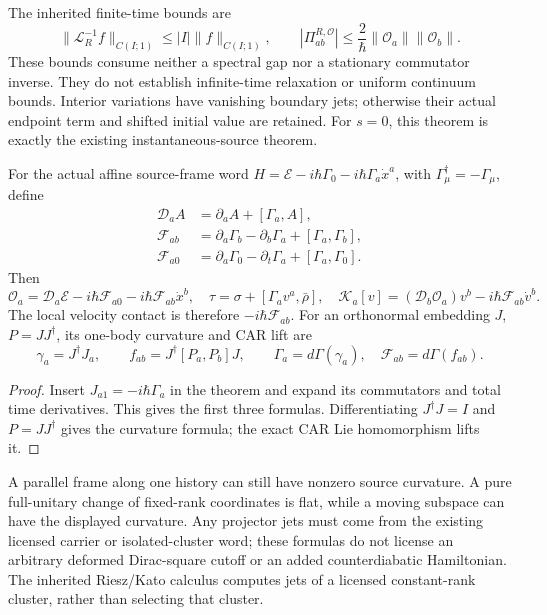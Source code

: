 \documentclass[12pt,a4paper]{article}
\begin{document}
The inherited finite-time bounds are
\[
 \|\mathscr L_R^{-1}f\|_{C(I;1)}\le |I|\|f\|_{C(I;1)},\qquad
 |\Pi^{R,\mathcal O}_{ab}|\le
               \frac2\hbar\|\mathcal O_a\|\|\mathcal O_b\|.
\]
These bounds consume neither a spectral gap nor a stationary commutator
inverse. They do not establish infinite-time relaxation or uniform
continuum bounds. Interior variations have vanishing boundary jets;
otherwise their actual endpoint term and shifted initial value are retained.
For $s=0$, this theorem is exactly the existing instantaneous-source theorem.

\begin{corollary}
\label{p4:cor:v4106-moving-carrier-contact}
For the actual affine source-frame word
$H=\mathcal E-i\hbar\Gamma_0-i\hbar\Gamma_a\dot x^a$,
with $\Gamma_\mu^\dagger=-\Gamma_\mu$, define
\begin{align*}
 \mathcal D_aA&=\partial_aA+[\Gamma_a,A],\\
 \mathcal F_{ab}&=\partial_a\Gamma_b-\partial_b\Gamma_a+
                                      [\Gamma_a,\Gamma_b],\\
 \mathcal F_{a0}&=\partial_a\Gamma_0-\partial_t\Gamma_a+
                                      [\Gamma_a,\Gamma_0].
\end{align*}
Then
\[
 \mathcal O_a=\mathcal D_a\mathcal E-i\hbar\mathcal F_{a0}
                          -i\hbar\mathcal F_{ab}\dot x^b,\quad
 \tau=\sigma+[\Gamma_av^a,\bar\rho],\quad
 \mathcal K_a[v]=(\mathcal D_b\mathcal O_a)v^b
                          -i\hbar\mathcal F_{ab}\dot v^b.
\]
The local velocity contact is therefore $-i\hbar\mathcal F_{ab}$.
For an orthonormal embedding $J$, $P=JJ^\dagger$,
its one-body curvature and CAR lift are
\[
 \gamma_a=J^\dagger J_a,\qquad
 f_{ab}=J^\dagger[P_a,P_b]J,\qquad
 \Gamma_a=d\Gamma(\gamma_a),\quad\mathcal F_{ab}=d\Gamma(f_{ab}).
\]
\end{corollary}
\begin{proof}
Insert $J_{a1}=-i\hbar\Gamma_a$ in the theorem and expand its commutators
and total time derivatives. This gives the first three formulas.
Differentiating $J^\dagger J=I$ and $P=JJ^\dagger$ gives the curvature
formula; the exact CAR Lie homomorphism lifts it.
\end{proof}
A parallel frame along one history can still have nonzero source curvature.
A pure full-unitary change of fixed-rank coordinates is flat, while a moving
subspace can have the displayed curvature. Any projector jets must come
from the existing licensed carrier or isolated-cluster word; these formulas
do not license an arbitrary deformed Dirac-square cutoff or an added
counterdiabatic Hamiltonian. The inherited Riesz/Kato calculus computes
jets of a licensed constant-rank cluster, rather than selecting that cluster.
\end{document}
